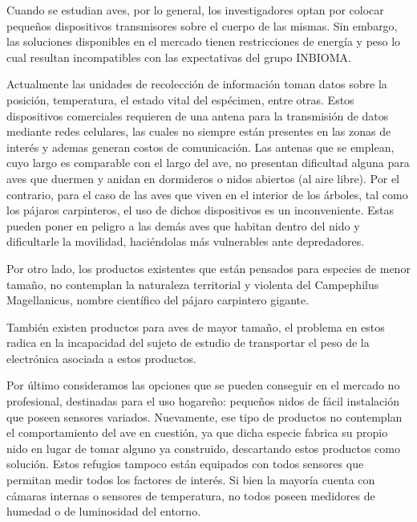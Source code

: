%

%



Cuando se estudian aves, por lo general, los investigadores optan por colocar pequeños dispositivos transmisores sobre el cuerpo de las mismas. Sin embargo, las soluciones disponibles en el mercado tienen restricciones de energía y peso lo cual resultan incompatibles con las expectativas del grupo INBIOMA.

Actualmente las unidades de recolección de información toman datos sobre la posición, temperatura, el estado vital del espécimen, entre otras. Estos dispositivos comerciales requieren de una antena para la transmisión de datos mediante redes celulares, las cuales no siempre están presentes en las zonas de interés y ademas generan costos de comunicación. Las antenas que se emplean, cuyo largo es comparable con el largo del ave, no presentan dificultad alguna para aves que duermen y anidan en dormideros o nidos abiertos (al aire libre). Por el contrario, para el caso de las aves que viven en el interior de los árboles, tal como los pájaros carpinteros, el uso de dichos dispositivos es un inconveniente. Estas pueden poner en peligro a las demás aves que habitan dentro del nido y dificultarle la movilidad, haciéndolas más vulnerables ante depredadores.

Por otro lado, los productos existentes que están pensados para especies de menor tamaño, no contemplan la naturaleza territorial y violenta del Campephilus Magellanicus, nombre científico del pájaro carpintero gigante.

También existen productos para aves de mayor tamaño, el problema en estos radica en la incapacidad del sujeto de estudio de transportar el peso de la electrónica asociada a estos productos.

Por último consideramos las opciones que se pueden conseguir en el mercado no profesional, destinadas para el uso hogareño: pequeños nidos de fácil instalación que poseen sensores variados. Nuevamente, ese tipo de productos no contemplan el comportamiento del ave en cuestión, ya que dicha especie fabrica su propio nido en lugar de tomar alguno ya construido, descartando estos productos como solución. Estos refugios tampoco están equipados con todos sensores que permitan medir todos los factores de interés. Si bien la mayoría cuenta con cámaras internas o sensores de temperatura, no todos poseen medidores de humedad o de luminosidad del entorno. 

